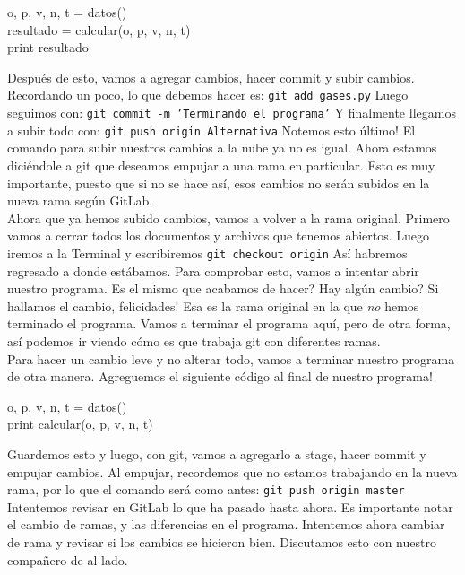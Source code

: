 \documentclass[10pt,letterpaper]{article}
\newcommand{\inlinecode}[1]{
\colorbox{light-gray}{\texttt{#1}}
}
\newenvironment{Code}
{
\begin{lrbox}{\selvestebox}%
\begin{minipage}{\dimexpr\columnwidth-2\fboxsep\relax}
\fontfamily{\ttdefault}\selectfont
}
{\end{minipage}\end{lrbox}%
\begin{center}
\colorbox{light-gray}{\usebox{\selvestebox}}
\end{center}
}
\begin{document}
\begin{Code}
o, p, v, n, t = datos()\\
resultado = calcular(o, p, v, n, t)\\
print resultado
\end{Code}

Despu\'es de esto, vamos a agregar cambios, hacer commit y subir cambios. Recordando un poco, lo que debemos hacer es: \inlinecode{git add gases.py} Luego seguimos con: \inlinecode{git commit -m 'Terminando el programa'} Y finalmente llegamos a subir todo con: \inlinecode{git push origin Alternativa} Notemos esto \'ultimo! El comando para subir nuestros cambios a la nube ya no es igual. Ahora estamos dici\'endole a git que deseamos empujar a una rama en particular. Esto es muy importante, puesto que si no se hace as\'i, esos cambios no ser\'an subidos en la nueva rama seg\'un GitLab.\\

Ahora que ya hemos subido cambios, vamos a volver a la rama original. Primero vamos a cerrar todos los documentos y archivos que tenemos abiertos. Luego iremos a la Terminal y escribiremos \inlinecode{git checkout origin} As\'i habremos regresado a donde est\'abamos. Para comprobar esto, vamos a intentar abrir nuestro programa. Es el mismo que acabamos de hacer? Hay alg\'un cambio? Si hallamos el cambio, felicidades! Esa es la rama original en la que \textit{no} hemos terminado el programa. Vamos a terminar el programa aqu\'i, pero de otra forma, as\'i podemos ir viendo c\'omo es que trabaja git con diferentes ramas.\\

Para hacer un cambio leve y no alterar todo, vamos a terminar nuestro programa de otra manera. Agreguemos el siguiente c\'odigo al final de nuestro programa!

\begin{Code}
o, p, v, n, t = datos()\\
print calcular(o, p, v, n, t)
\end{Code}

Guardemos esto y luego, con git, vamos a agregarlo a stage, hacer commit y empujar cambios. Al empujar, recordemos que no estamos trabajando en la nueva rama, por lo que el comando ser\'a como antes: \inlinecode{git push origin master} Intentemos revisar en GitLab lo que ha pasado hasta ahora. Es importante notar el cambio de ramas, y las diferencias en el programa. Intentemos ahora cambiar de rama y revisar si los cambios se hicieron bien. Discutamos esto con nuestro compa\~nero de al lado.
\end{document}
